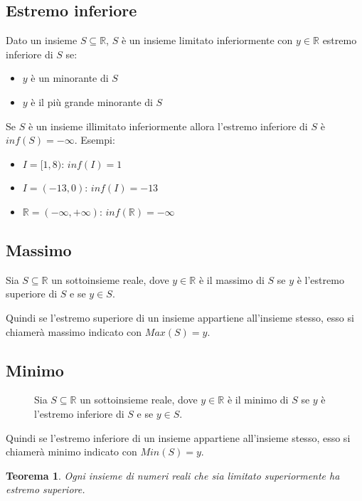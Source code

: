 \documentclass[a4paper]{article}
\newtheorem{theorem}{Teorema}
\theoremstyle{break}
\theoremstyle{break}
\theoremstyle{break}
\theoremstyle{break}
\begin{document}
\subsection{Estremo inferiore}
Dato un insieme \( S \subseteq \mathbb{R} \), \( S \) è un insieme limitato inferiormente con \( y \in \mathbb{R} \)
estremo inferiore di \( S \) se:
\begin{itemize}
  \item \( y \) è un minorante di \( S \)
  \item \( y \) è il più grande minorante di \( S \)
\end{itemize}
Se \( S \) è un insieme illimitato inferiormente allora l'estremo inferiore di \( S \) è \( inf(S)=-\infty \).
Esempi:
\begin{itemize}
  \item \( I=[1,8) \): \( inf(I) = 1 \)
  \item \( I=(-13,0) \): \( inf(I) = -13 \)
  \item \( \mathbb{R} = (-\infty, +\infty) \): \( inf(\mathbb{R}) = -\infty \)
\end{itemize}


\subsection{Massimo}
\begin{definition}
  Sia \( S \subseteq \mathbb{R} \) un sottoinsieme reale, dove \( y \in \mathbb{R} \) è il massimo
  di \( S \) se \( y \) è l'estremo superiore di \( S \) e se \( y \in S \).
\end{definition}
Quindi se l'estremo superiore di un insieme appartiene all'insieme stesso, esso si chiamerà
massimo indicato con \( Max(S)=y \).


\subsection{Minimo}
\begin{figure}[H]
  \begin{definition}
    Sia \( S \subseteq \mathbb{R} \) un sottoinsieme reale, dove \( y \in \mathbb{R} \) è il minimo
    di \( S \) se \( y \) è l'estremo inferiore di \( S \) e se \( y \in S \).
  \end{definition}
\end{figure}
Quindi se l'estremo inferiore di un insieme appartiene all'insieme stesso, esso si chiamerà
minimo indicato con \( Min(S)=y \).

\begin{theorem}
  Ogni insieme di numeri reali che sia limitato superiormente ha estremo superiore.
\end{theorem}
\end{document}
